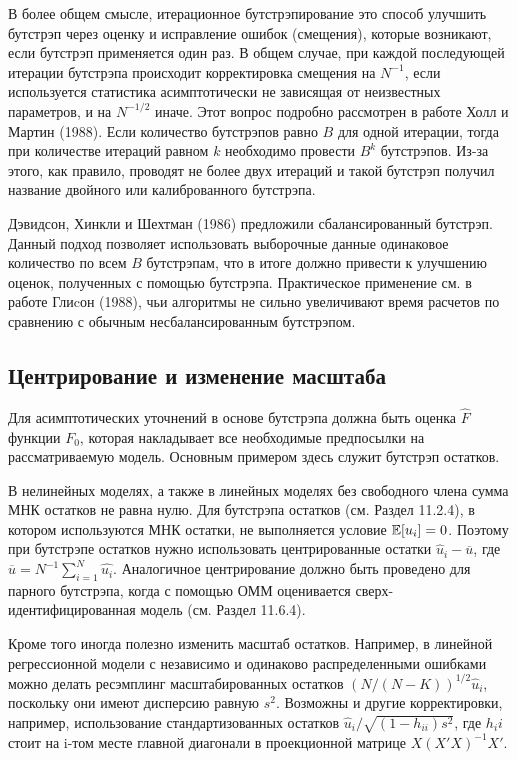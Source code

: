 В более общем смысле, итерационное бутстрэпирование это способ улучшить бутстрэп через оценку и исправление ошибок (смещения), которые возникают, если бутстрэп применяется один раз. В общем случае, при каждой последующей итерации бутстрэпа происходит корректировка смещения на $N^{-1}$, если используется статистика асимптотически не зависящая от неизвестных параметров, и на $N^{-1/2}$ иначе. Этот вопрос подробно рассмотрен в работе Холл и Мартин (1988). Если количество бутстрэпов равно $B$ для одной итерации, тогда при количестве итераций равном $k$ необходимо провести $B^k$ бутстрэпов. Из-за этого, как правило, проводят не более двух итераций и такой бутстрэп получил название двойного или калиброванного бутстрэпа.

Дэвидсон, Хинкли и Шехтман (1986) предложили  сбалансированный бутстрэп. Данный подход позволяет использовать выборочные данные одинаковое количество по всем $B$ бутстрэпам, что в итоге должно привести к улучшению оценок, полученных с помощью бутстрэпа. Практическое применение см. в работе Глиcон (1988), чьи алгоритмы не сильно увеличивают время расчетов по сравнению с обычным несбалансированным бутстрэпом.

\subsection{Центрирование и изменение масштаба}

Для  асимптотических уточнений в основе бутстрэпа должна быть оценка $\hat{F}$ функции $F_0$, которая накладывает все необходимые предпосылки на рассматриваемую модель. Основным примером здесь служит бутстрэп остатков.

В нелинейных моделях, а также в линейных моделях без свободного члена сумма МНК остатков не равна нулю. Для бутстрэпа остатков (см. Раздел 11.2.4), в котором используются МНК остатки, не выполняется условие $\mathbb{E}[u_i]=0$. Поэтому при бутстрэпе остатков нужно использовать центрированные остатки $\hat{u}_i-\overline{u}$, где $\overline{u}=N^{-1}\sum_{i=1}^N\hat{u_i}$. Аналогичное центрирование должно быть проведено для парного бутстрэпа, когда с помощью ОММ оценивается сверх-идентифицированная модель (см. Раздел 11.6.4).

Кроме того иногда полезно изменить масштаб остатков. Например, в линейной регрессионной модели с независимо и одинаково распределенными ошибками можно делать ресэмплинг масштабированных остатков $(N/(N-K))^{1/2}\hat{u}_i$, поскольку они имеют дисперсию равную $s^2$. Возможны и другие корректировки, например, использование стандартизованных остатков $\hat{u}_i/\sqrt{(1-h_{ii})s^2}$, где $h_ii$ стоит на i-том месте главной диагонали в проекционной матрице $X(X'X)^{-1}X'$.

